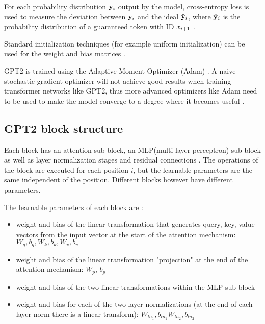 For each probability distribution ${\mathbf{y}}_i$ output by the model, cross-entropy loss is used to measure the deviation between ${\mathbf{y}}_i$ and the ideal ${\hat{\mathbf{y}}}_i$,
where ${\hat{\mathbf{y}}}_i$ is the probability distribution of a guaranteed token with ID ${x}_{i+1}$  \cite{HuggingFaceGPT2}.

Standard initialization techniques (for example uniform initialization) can be used for the weight and bias matrices .

GPT2 is trained using the Adaptive Moment Optimizer (Adam)  .
A naive stochastic gradient optimizer will not achieve good results when training transformer networks like GPT2, thus more advanced optimizers like Adam need to be used to make the model converge to a degree where it becomes useful \cite{adambeatssgd}.






\subsection{GPT2 block structure}

\label{gpt2:block}


Each block has an attention sub-block, an MLP(multi-layer perceptron) sub-block as well as layer normalization stages and residual connections  .
The operations of the block are executed for each position $i$, but the learnable parameters are the same independent of the position. Different blocks however have different parameters.

The learnable parameters of each block are \cite{alammar-gpt2}:

\begin{itemize}
\item weight and bias of the linear transformation that generates query, key, value vectors from the input vector
   at the start of the attention mechanism: $W_q, b_q, W_k, b_k, W_v, b_v$
 \item weight and bias of the linear transformation "projection" at the end of the attention mechanism: $W_p$, $b_p$
 \item weight and bias of the two linear transformations within the MLP sub-block
 \item weight and bias for each of the two layer normalizations (at the end of each layer norm there is a linear transform): $W_{ln_1}, b_{ln_1} W_{ln_2}, b_{ln_2}$
\end{itemize}


